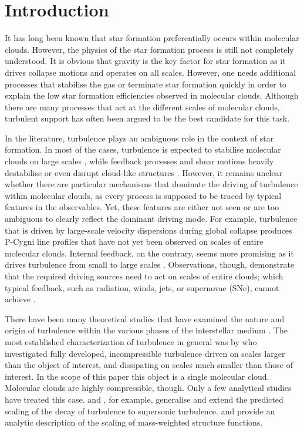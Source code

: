 \section{Introduction}\label{intro}

It has long been known that star formation preferentially occurs within molecular clouds. 
However, the physics of the star formation process is still not completely understood.
It is obvious that gravity is the key factor for star formation as it drives collapse motions and operates on all scales.
However, one needs additional processes that stabilise the gas or terminate star formation quickly in order to explain the low star formation efficiencies observed in molecular clouds. 
Although there are many processes that act at the different scales of molecular clouds, turbulent support has often been argued to be the best candidate for this task.

In the literature, turbulence plays an ambiguous role in the context of star formation. 
In most of the cases, turbulence is expected to stabilise molecular clouds on large scales \citep{Fleck1980,McKee1992,MacLow2003}, while feedback processes and shear motions heavily destabilise or even disrupt cloud-like structures \citep{Tan2013,Miyamoto2014}. 
However, it remains unclear whether there are particular mechanisms that dominate the driving of turbulence within molecular clouds, as every process is supposed to be traced by typical features in the observables.
Yet, these features are either not seen or are too ambiguous to clearly reflect the dominant driving mode.
For example, turbulence that is driven by large-scale velocity dispersions during global collapse \citep{Ballesteros2011a,Ballesteros2011b,Hartmann2012} produces P-Cygni line profiles that have not yet been observed on scales of entire molecular clouds. 
Internal feedback, on the contrary, seems more promising as it drives turbulence from small to large scales \citep{Dekel2013,Krumholz2014}.
Observations, though, demonstrate that the required driving sources need to act on scales of entire clouds; which typical feedback, such as radiation, winds, jets, or supernovae (SNe), cannot achieve \citep{Heyer2004,Brunt2009,Brunt2013}.

There have been many theoretical studies that have examined the nature and origin of turbulence within the various phases of the interstellar medium \citep[ISM;][and references within]{MacLow2004}. 
The most established characterization of turbulence in general was by \citet{Kolmogorov1941} who investigated fully developed, incompressible turbulence driven on scales larger than the object of interest, and dissipating on scales much smaller than those of interest.
In the scope of this paper this object is a single molecular cloud. 
Molecular clouds are highly compressible, though.
Only a few analytical studies have treated this case.
\citet{She1994} and \citet{Boldyrev2002}, for example, generalise and extend the predicted scaling of the decay of turbulence to supersonic turbulence.
\citet{Galtier2011} and \citet{Banerjee2013} provide an analytic description of the scaling of mass-weighted structure functions.

